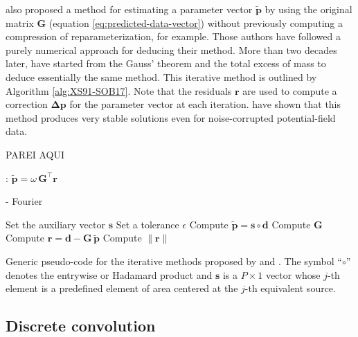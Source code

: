 \cite{xia-sprowl1991} also proposed a method for estimating a parameter 
vector $\tilde{\mathbf{p}}$ by using the original matrix $\mathbf{G}$ (equation \ref{eq:predicted-data-vector})
without previously computing a compression of reparameterization, for example.
Those authors have followed a purely numerical approach for deducing their method.
More than two decades later, \cite{siqueira-etal2017} have started from the Gauss' theorem \cite[prefix][p. 43]{kellogg1967}
and the total excess of mass \cite[][p. 60]{blakely1996} to deduce essentially the same method.
This iterative method is outlined by Algorithm \ref{alg:XS91-SOB17}.
Note that the residuals $\mathbf{r}$ are used to compute a correction $\boldsymbol{\Delta}\mathbf{p}$
for the parameter vector at each iteration.
\citet{siqueira-etal2017} have shown that this method produces very stable solutions even for noise-corrupted potential-field data.

PAREI AQUI

\cite{jirigalatu-ebbing2019}: $\tilde{\mathbf{p}} = \omega \, \mathbf{G}^{\top} \mathbf{r}$

\cite{xia-etal1993} - Fourier


\begin{algorithm}
	\Input{}
	Set the auxiliary vector $\mathbf{s}$ \;
	Set a tolerance $\epsilon$ \;
	Compute $\tilde{\mathbf{p}} = \mathbf{s} \circ \mathbf{d}$ \;
	Compute $\mathbf{G}$ \;
	Compute $\mathbf{r} = \mathbf{d} - \mathbf{G} \, \tilde{\mathbf{p}}$ \;
	Compute $\| \mathbf{r} \|$ \;
	\caption{Generic pseudo-code for the iterative methods proposed by \cite{xia-sprowl1991} and \cite{siqueira-etal2017}.
	The symbol ``$\circ$'' denotes the entrywise or Hadamard product \cite[e.g.,][p. 298]{horn-johnson1991} and
	$\mathbf{s}$ is a $P \times 1$ vector whose $j$-th element is a predefined element of area centered at the $j$-th
	equivalent source.}
	\label{alg:XS91-SOB17}
\end{algorithm}

\subsection{Discrete convolution}

\cite{takahashi-etal2020}

